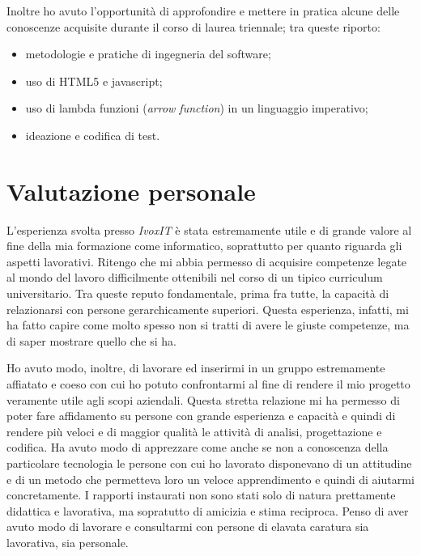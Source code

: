 Inoltre ho avuto l'opportunità di approfondire e mettere in pratica alcune delle conoscenze acquisite durante il corso di laurea triennale; tra queste riporto:
\begin{itemize}
    \item metodologie e pratiche di ingegneria del software;
    \item uso di HTML5 e javascript;
    \item uso di lambda funzioni (\emph{arrow function}) in un linguaggio imperativo;
    \item ideazione e codifica di test.
\end{itemize}


\section{Valutazione personale}
L'esperienza svolta presso \emph{IvoxIT} è stata estremamente utile e di grande valore al fine della mia formazione come informatico, soprattutto per quanto riguarda gli aspetti lavorativi. Ritengo che mi abbia permesso di acquisire competenze legate al mondo del lavoro difficilmente ottenibili nel corso di un tipico curriculum universitario. Tra queste reputo fondamentale, prima fra tutte, la capacità di relazionarsi con persone gerarchicamente superiori. Questa esperienza, infatti, mi ha fatto capire come molto spesso non si tratti di avere le giuste competenze, ma di saper mostrare quello che si ha.

Ho avuto modo, inoltre, di lavorare ed inserirmi in un gruppo estremamente affiatato e coeso con cui ho potuto confrontarmi al fine di rendere il mio progetto veramente utile agli scopi aziendali. Questa stretta relazione mi ha permesso di poter fare affidamento su persone con grande esperienza e capacità e quindi di rendere più veloci e di maggior qualità le attività di analisi, progettazione e codifica. Ha avuto modo di apprezzare come anche se non a conoscenza della particolare tecnologia le persone con cui ho lavorato disponevano di un attitudine e di un metodo che permetteva loro un veloce apprendimento e quindi di aiutarmi concretamente. I rapporti instaurati non sono stati solo di natura prettamente didattica e lavorativa, ma sopratutto di amicizia e stima reciproca. Penso di aver avuto modo di lavorare e consultarmi con persone di elavata caratura sia lavorativa, sia personale. 

